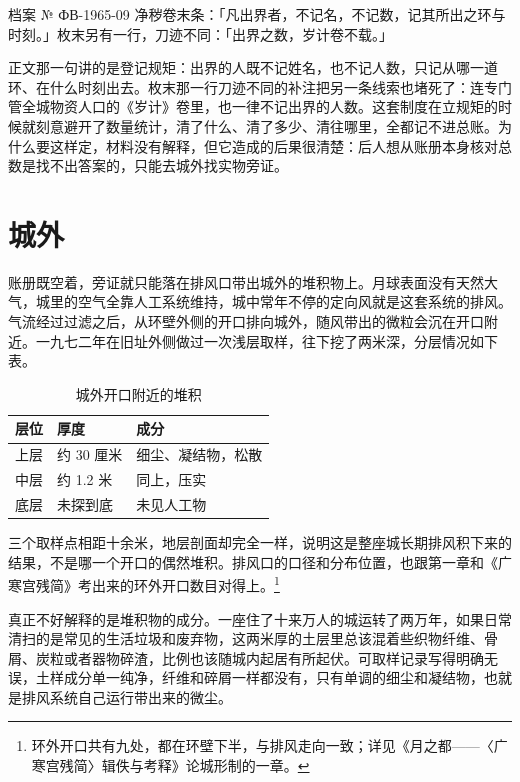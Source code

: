 \begin{archive}[内部参考]{档案 № ФВ-1965-09}
净秽卷末条：「凡出界者，不记名，不记数，记其所出之环与时刻。」枚末另有一行，刀迹不同：「出界之数，岁计卷不载。」
\end{archive}

正文那一句讲的是登记规矩：出界的人既不记姓名，也不记人数，只记从哪一道环、在什么时刻出去。枚末那一行刀迹不同的补注把另一条线索也堵死了：连专门管全城物资人口的《岁计》卷里，也一律不记出界的人数。这套制度在立规矩的时候就刻意避开了数量统计，清了什么、清了多少、清往哪里，全都记不进总账。为什么要这样定，材料没有解释，但它造成的后果很清楚：后人想从账册本身核对总数是找不出答案的，只能去城外找实物旁证。

\section{城外}

账册既空着，旁证就只能落在排风口带出城外的堆积物上。月球表面没有天然大气，城里的空气全靠人工系统维持，城中常年不停的定向风就是这套系统的排风。气流经过过滤之后，从环壁外侧的开口排向城外，随风带出的微粒会沉在开口附近。一九七二年在旧址外侧做过一次浅层取样，往下挖了两米深，分层情况如下表。

\begin{table}[htbp]
  \centering
  \caption{城外开口附近的堆积}
  \begin{tabular}{@{}lll@{}}
    \toprule
    层位 & 厚度 & 成分\\
    \midrule
    上层 & 约 30 厘米 & 细尘、凝结物，松散 \\
    中层 & 约 1.2 米 & 同上，压实 \\
    底层 & 未探到底 & 未见人工物 \\
    \bottomrule
  \end{tabular}
\end{table}

三个取样点相距十余米，地层剖面却完全一样，说明这是整座城长期排风积下来的结果，不是哪一个开口的偶然堆积。排风口的口径和分布位置，也跟第一章和《广寒宫残简》考出来的环外开口数目对得上。\footnote{环外开口共有九处，都在环壁下半，与排风走向一致；详见《月之都——〈广寒宫残简〉辑佚与考释》论城形制的一章。}

真正不好解释的是堆积物的成分。一座住了十来万人的城运转了两万年，如果日常清扫的是常见的生活垃圾和废弃物，这两米厚的土层里总该混着些织物纤维、骨屑、炭粒或者器物碎渣，比例也该随城内起居有所起伏。可取样记录写得明确无误，土样成分单一纯净，纤维和碎屑一样都没有，只有单调的细尘和凝结物，也就是排风系统自己运行带出来的微尘。

